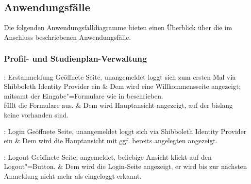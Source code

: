 \subsection{Anwendungsfälle}

Die folgenden Anwendungsfalldiagramme bieten einen Überblick über die im Anschluss beschriebenen Anwendungsfälle.

\begin{center}
	\resizebox{\textwidth}{!} {
		
	}
\end{center}

\begin{center}	
	\resizebox{\textwidth}{!} {
		
	}
\end{center}


\subsubsection{Profil- und Studienplan-Verwaltung}

\begin{usecase}{: Erstanmeldung}
	{Geöffnete Seite, unangemeldet}
	 loggt sich zum ersten Mal via \gls{Shibboleth Identity Provider} ein
	& Dem  wird eine Willkommensseite angezeigt; mitsamt der Eingabe"=Formulare wie in  beschrieben.\\ 
	\hline
	 füllt die Formulare aus.
	& Dem  wird Hauptansicht angezeigt, auf der bislang keine  vorhanden sind. 	
\end{usecase}

\begin{usecase}{: Login}
	{Geöffnete Seite, unangemeldet}
	 loggt sich via \gls{Shibboleth Identity Provider} ein
	& Dem  wird die Hauptansicht mit ggf. bereits angelegten  angezeigt.
\end{usecase}

\begin{usecase}{: Logout}
	{Geöffnete Seite, angemeldet, beliebige Ansicht}
	 klickt auf den Logout"=Button.
	& Dem  wird die Login-Seite angezeigt, er wird bis zur nächsten Anmeldung nicht mehr als eingeloggt erkannt.
\end{usecase}

